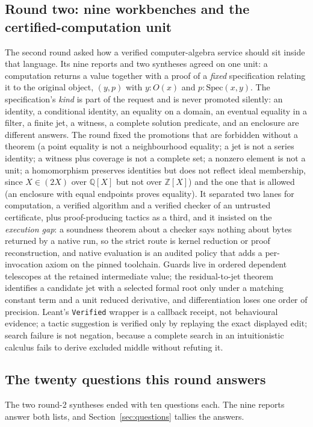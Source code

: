 \documentclass[11pt,a4paper]{article}
\newcommand{\code}[1]{\nolinkurl{#1}}
\newcommand{\Z}{\mathbb Z}
\newcommand{\Q}{\mathbb Q}
\theoremstyle{definition}
\begin{document}
\subsection{Round two: nine workbenches and the certified-computation unit}
The second round asked how a verified computer-algebra service should sit inside that language. Its nine reports and two syntheses agreed on one unit: a computation returns a value together with a proof of a \emph{fixed} specification relating it to the original object, $(y,p)$ with $y:O(x)$ and $p:\mathrm{Spec}(x,y)$. The specification's \emph{kind} is part of the request and is never promoted silently: an identity, a conditional identity, an equality on a domain, an eventual equality in a filter, a finite jet, a witness, a complete solution predicate, and an enclosure are different answers. The round fixed the promotions that are forbidden without a theorem (a point equality is not a neighbourhood equality; a jet is not a series identity; a witness plus coverage is not a complete set; a nonzero element is not a unit; a homomorphism preserves identities but does not reflect ideal membership, since $X\in(2X)$ over $\Q[X]$ but not over $\Z[X]$) and the one that is allowed (an enclosure with equal endpoints proves equality). It separated two lanes for computation, a verified algorithm and a verified checker of an untrusted certificate, plus proof-producing tactics as a third, and it insisted on the \emph{execution gap}: a soundness theorem about a checker says nothing about bytes returned by a native run, so the strict route is kernel reduction or proof reconstruction, and native evaluation is an audited policy that adds a per-invocation axiom on the pinned toolchain. Guards live in ordered dependent telescopes at the retained intermediate value; the residual-to-jet theorem identifies a candidate jet with a selected formal root only under a matching constant term and a unit reduced derivative, and differentiation loses one order of precision. Leant's \code{Verified} wrapper is a callback receipt, not behavioural evidence; a tactic suggestion is verified only by replaying the exact displayed edit; search failure is not negation, because a complete search in an intuitionistic calculus fails to derive excluded middle without refuting it.

\subsection{The twenty questions this round answers}\label{sec:20}
The two round-2 syntheses ended with ten questions each. The nine reports answer both lists, and Section~\ref{sec:questions} tallies the answers.
\end{document}
